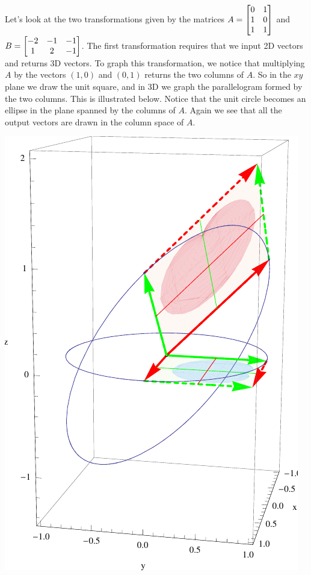 \begin{example}
Let's look at the two transformations given by the matrices
$A=\begin{bmatrix} 0&1\\1&0\\1&1 \end{bmatrix}$ and 
$B=\begin{bmatrix} -2&-1&-1\\1&2&-1 \end{bmatrix}$.
The first transformation requires that we input 2D vectors and returns 3D vectors. To graph this transformation, we notice that multiplying $A$ by the vectors $(1,0)$ and $(0,1)$ returns the two columns of $A$.  So in the $xy$ plane we draw the unit square, and in 3D we graph the parallelogram formed by the two columns.  This is illustrated below. Notice that the unit circle becomes an ellipse in the plane spanned by the columns of $A$.  Again we see that all the output vectors are drawn in the column space of $A$.
\begin{center}
\includegraphics[width=\marginparwidth]{04-Linear-Transformations/support/LT2dto3d}
\end{center}


\end{example}
